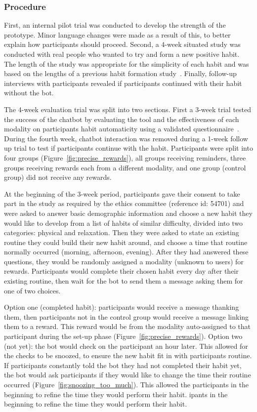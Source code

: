 \subsubsection{Procedure}
First, an internal pilot trial was conducted to develop the strength of the prototype. Minor language changes were made as a result of this, to better explain how participants should proceed. Second, a  4-week situated study was conducted with real people who wanted to try and form a new positive habit. The length of the study was appropriate for the simplicity of each habit and was based on the lengths of a previous habit formation study~\cite{article_beyond_self_tracking_designing_apps}. Finally, follow-up interviews with participants revealed if participants continued with their habit without the bot.

The 4-week evaluation trial was split into two sections. First a 3-week trial tested the success of the chatbot by evaluating the tool and the effectiveness of each modality on participants habit automaticity using a validated questionnaire~\cite{article_4q_SRBAI}. During the fourth week, chatbot interaction was removed during a 1-week follow up trial to test if participants continue with the habit. Participants were split into four groups (Figure~\ref{fig:precise_rewards}), all groups receiving reminders, three groups receiving rewards each from a different modality, and one group (control group) did not receive any rewards.

At the beginning of the 3-week period, participants gave their consent to take part in the study as required by the ethics committee (reference id: 54701) and were asked to answer basic demographic information and choose a new habit they would like to develop from a list of habits of similar difficulty, divided into two categories: physical and relaxation. Then they were asked to state an existing routine they could build their new habit around, and choose a time that routine normally occurred (morning, afternoon, evening). After they had answered these questions, they would be randomly assigned a modality (unknown to users) for rewards. Participants would complete their chosen habit every day after their existing routine, then wait for the bot to send them a message asking them for one of two choices.

Option one (completed habit): participants would receive a message thanking them, then participants not in the control group would receive a message linking them to a reward. This reward would be from the modality auto-assigned to that participant during the set-up phase (Figure~\ref{fig:precise_rewards}). Option two (not yet): the bot would check on the participant an hour later. This allowed for the checks to be snoozed, to ensure the new habit fit in with participants routine. If participants constantly told the bot they had not completed their habit yet, the bot would ask participants if they would like to change the time their routine occurred (Figure~\ref{fig:snoozing_too_much}). This allowed the participants in the beginning to refine the time they would perform their habit.
ipants in the beginning to refine the time they would perform their habit.


